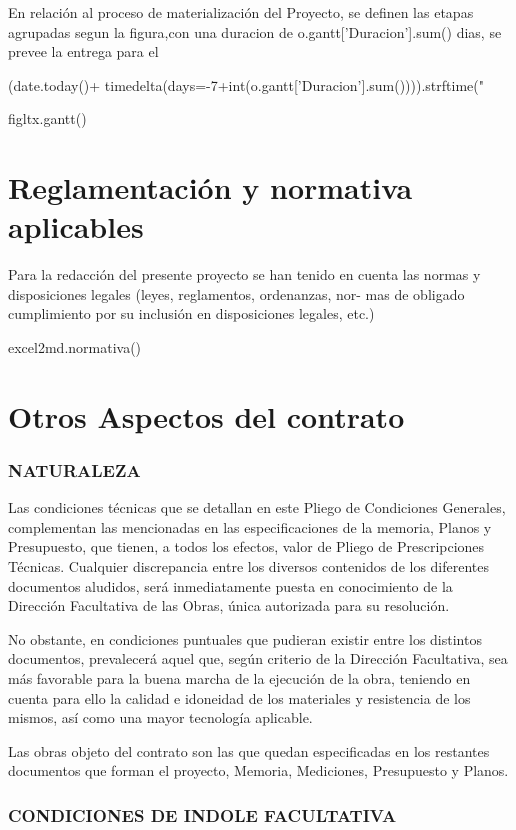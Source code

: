 \documentclass{article}
\begin{document}
En relación al proceso de materialización del Proyecto, se definen las etapas agrupadas segun la figura,con una duracion de {o.gantt['Duracion'].sum()} dias, se prevee la entrega  para el
{(date.today()+ timedelta(days=-7+int(o.gantt['Duracion'].sum()))).strftime("%

{figltx.gantt()}

\section{ Reglamentación y  normativa aplicables}
Para la redacción del presente proyecto se han tenido en cuenta las normas y disposiciones legales (leyes, reglamentos, ordenanzas, nor-
mas de obligado cumplimiento por su inclusión en disposiciones legales, etc.)

{excel2md.normativa()}

\section{ Otros Aspectos del contrato}

\subsubsection{ NATURALEZA}

Las condiciones técnicas que se detallan en este Pliego de  Condiciones Generales, complementan las mencionadas en las  especificaciones de la memoria, Planos y Presupuesto, que tienen, a todos  los efectos, valor de Pliego de Prescripciones Técnicas. Cualquier  discrepancia entre los diversos contenidos de los diferentes documentos  aludidos, será inmediatamente puesta en conocimiento de la Dirección  Facultativa de las Obras, única autorizada para su resolución.  

No obstante, en condiciones puntuales que pudieran existir entre los  distintos documentos, prevalecerá aquel que, según criterio de la Dirección  Facultativa, sea más favorable para la buena marcha de la ejecución de la  obra, teniendo en cuenta para ello la calidad e idoneidad de los materiales  y resistencia de los mismos, así como una mayor tecnología aplicable.  

Las obras objeto del contrato son las que quedan especificadas en los  restantes documentos que forman el proyecto, Memoria, Mediciones,  Presupuesto y Planos.  

\subsubsection{ CONDICIONES DE INDOLE FACULTATIVA}
}
\end{document}
